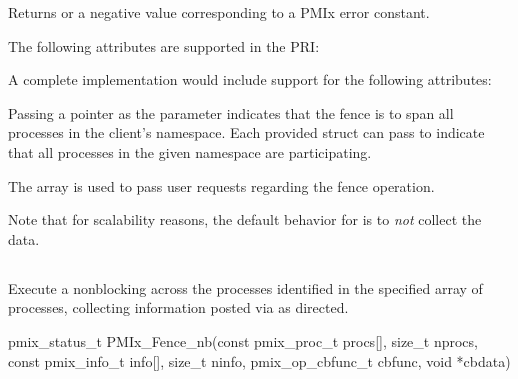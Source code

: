 \begin{arglist}
\end{arglist}

Returns  or a negative value corresponding to a PMIx error constant.

\priattr
The following attributes are supported in the \ac{PRI}:


\optattr
A complete implementation would include support for the following attributes:


\descr

Passing a  pointer as the  parameter indicates that the fence is to span all processes in the client's namespace.
Each provided  struct can pass  to indicate that all processes in the given namespace are participating.

The  array is used to pass user requests regarding the fence operation.

Note that for scalability reasons, the default behavior for  is to \emph{not} collect the data.


\subsection{}

\summary

Execute a nonblocking  across the processes identified in the specified array of processes, collecting information posted via  as directed.

\format

\cspecificstart
\begin{codepar}
pmix_status_t
PMIx_Fence_nb(const pmix_proc_t procs[], size_t nprocs,
              const pmix_info_t info[], size_t ninfo,
              pmix_op_cbfunc_t cbfunc, void *cbdata)
\end{codepar}
\cspecificend

